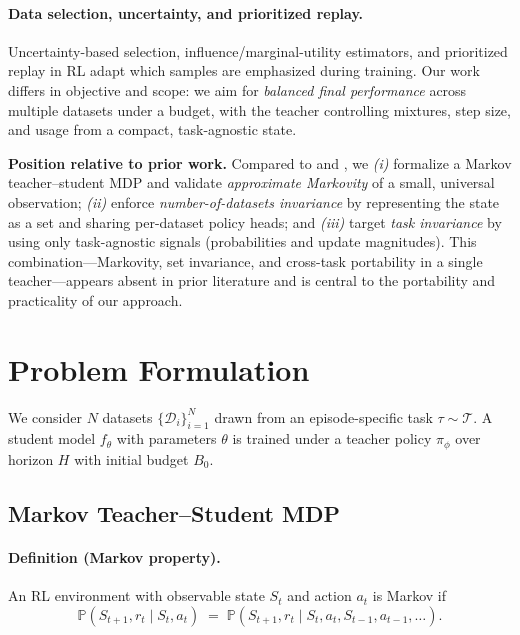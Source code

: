 \documentclass[11pt]{article}
\newcommand{\1}{\mathbf{1}}
\newcommand{\Prb}{\mathbb{P}}
\begin{document}
\paragraph{Data selection, uncertainty, and prioritized replay.} Uncertainty-based selection, influence/marginal-utility estimators, and prioritized replay in RL \citep{schaul2016prioritized} adapt which samples are emphasized during training. Our work differs in objective and scope: we aim for \emph{balanced final performance} across multiple datasets under a budget, with the teacher controlling mixtures, step size, and usage from a compact, task-agnostic state.

\medskip
\noindent\textbf{Position relative to prior work.} Compared to \citet{fan2018l2t} and \citet{wu2018l2tloss}, we \emph{(i)} formalize a Markov teacher--student MDP and validate \emph{approximate Markovity} of a small, universal observation; \emph{(ii)} enforce \emph{number-of-datasets invariance} by representing the state as a set and sharing per-dataset policy heads; and \emph{(iii)} target \emph{task invariance} by using only task-agnostic signals (probabilities and update magnitudes). This combination---Markovity, set invariance, and cross-task portability in a single teacher---appears absent in prior literature and is central to the portability and practicality of our approach.


\section{Problem Formulation}
We consider $N$ datasets $\{\mathcal{D}_i\}_{i=1}^N$ drawn from an episode-specific task $\tau\sim\mathcal{T}$.
A student model $f_\theta$ with parameters $\theta$ is trained under a teacher policy $\pi_\phi$ over horizon $H$ with initial budget $B_0$.

\subsection{Markov Teacher--Student MDP}\label{sec:mdp}
\paragraph{Definition (Markov property).}
An RL environment with observable state $S_t$ and action $a_t$ is Markov if
\begin{equation}
\Prb(S_{t+1},r_t \mid S_t,a_t) \;=\; \Prb(S_{t+1},r_t \mid S_t,a_t,S_{t-1},a_{t-1},\dots).
\label{eq:markov}
\end{equation}
\end{document}
